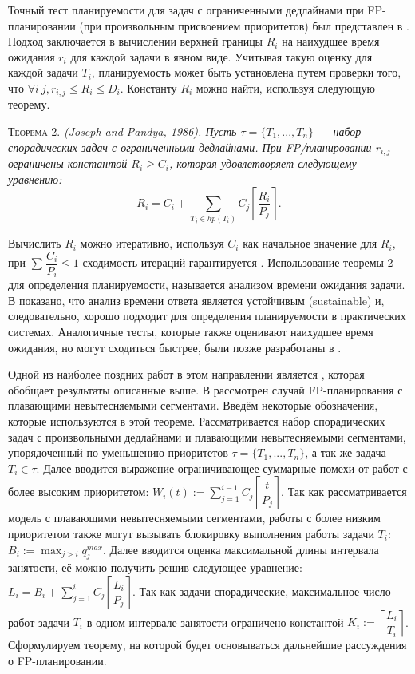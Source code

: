 \documentclass[14pt]{matmex-diploma-custom}
\begin{document}
Точный тест планируемости для задач с ограниченными дедлайнами при FP-планировании (при произвольным присвоением приоритетов) был представлен в \cite{Joseph1986FindingRT}. Подход заключается в вычислении верхней границы $R_i$ на наихудшее время ожидания $r_i$ для каждой задачи в явном виде. Учитывая такую оценку для каждой задачи $T_i$, планируемость может быть установлена путем проверки того, что $\forall i \ j, r_{i,j} \leq R_i \leq D_i$. Константу $R_i$ можно найти, используя следующую теорему. 

\textsc{Теорема 2.}
\textit{(Joseph and Pandya, 1986). Пусть $\tau = \{T_1, ... , T_n\}$ --- набор спорадических задач с ограниченными дедлайнами. При FP\-/планировании $r_{i,j}$ ограничены константой $R_i \geq C_i$, которая удовлетворяет следующему уравнению: $$ R_i = C_i + \sum_{T_j \in hp(T_i)} C_j \left \lceil \dfrac{R_i}{P_j} \right \rceil.$$
}

Вычислить $R_i$ можно итеративно, используя $C_i$ как начальное значение для $R_i$, при $\sum_{} \dfrac{C_i}{P_i} \leq 1$ сходимость итераций гарантируется \cite{Joseph1986FindingRT}. Использование теоремы 2 для определения планируемости, называется анализом времени ожидания задачи. В \cite{Baruah2006SustainableSA} показано, что анализ времени ответа является устойчивым (sustainable) и, следовательно, хорошо подходит для определения планируемости в практических системах. Аналогичные тесты, которые также оценивают наихудшее время ожидания, но могут сходиться быстрее, были позже разработаны в \cite{Audsley1991HardRS, Lehoczky1989TheRM}. 

Одной из наиболее поздних работ в этом направлении является \cite{Bertogna2011ImprovingFO}, которая обобщает результаты описанные выше. В \cite{Bertogna2011ImprovingFO} рассмотрен случай FP-планирования с плавающими невытесняемыми сегментами. Введём некоторые обозначения, которые используются в этой теореме. Рассматривается набор спорадических задач с произвольными дедлайнами и плавающими невытесняемыми сегментами, упорядоченный по уменьшению приоритетов $\tau = \{T_1, ... , T_n\}$, а так же задача $T_i \in \tau$. Далее вводится выражение ограничивающее суммарные помехи от работ с более высоким приоритетом: $W_i(t) := \sum_{j = 1}^{i-1} C_j \left \lceil \dfrac{t}{P_j} \right \rceil$. Так как рассматривается модель с плавающими невытесняемыми сегментами, работы с более низким приоритетом также могут вызывать блокировку выполнения работы задачи $T_i$: $B_i := \max_{j>i} q_{j}^{max}$. Далее вводится оценка максимальной длины интервала занятости, её можно получить решив следующее уравнение: $L_i = B_i + \sum_{j = 1}^{i} C_j \left \lceil \dfrac{L_i}{P_j} \right \rceil$. Так как задачи спорадические, максимальное число работ задачи $T_i$ в одном интервале занятости ограничено константой $K_i := \left \lceil \dfrac{L_i}{T_i} \right \rceil$. Сформулируем теорему, на которой будет основываться дальнейшие рассуждения о FP-планировании.
\end{document}
